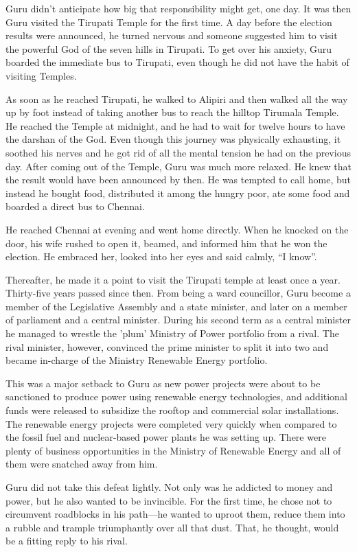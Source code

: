 Guru didn't anticipate how big that responsibility might get, one day. It was
then Guru visited the Tirupati Temple for the first time. A day before the
election results were announced, he turned nervous and someone suggested him to
visit the powerful God of the seven hills in Tirupati. To get over his anxiety,
Guru boarded the immediate bus to Tirupati, even though he did not have the
habit of visiting Temples.

As soon as he reached Tirupati, he walked to Alipiri and then walked all the way
up by foot instead of taking another bus to reach the hilltop Tirumala Temple.
He reached the Temple at midnight, and he had to wait for twelve hours to have
the darshan of the God. Even though this journey was physically exhausting, it
soothed his nerves and he got rid of all the mental tension he had on the
previous day. After coming out of the Temple, Guru was much more relaxed. He
knew that the result would have been announced by then. He was tempted to call
home, but instead he bought food, distributed it among the hungry poor, ate some
food and boarded a direct bus to Chennai.

He reached Chennai at evening and went home directly. When he knocked on the
door, his
wife rushed to open it, beamed, and informed him that he won the election. He
embraced her, looked into her eyes and said calmly, “I know”.

Thereafter, he made it a point to visit the Tirupati temple at least once a
year. Thirty-five years passed since then. From being a ward councillor, Guru
become a member of the Legislative Assembly and a state minister, and later on
a member of parliament and a central minister. During his second term as a central
minister he managed to wrestle the 'plum' Ministry of Power portfolio from a rival.
The rival minister, however, convinced the prime minister to split it
into two and became in-charge of the Ministry Renewable Energy portfolio.

This was a major setback to Guru as new power projects were about to be
sanctioned to produce power using renewable energy technologies, and additional
funds were released to subsidize the rooftop and commercial solar installations.
The renewable energy projects were completed very quickly when compared to the
fossil fuel and nuclear-based power plants he was setting up. There were plenty of
business opportunities in the Ministry of Renewable Energy and all of them were
snatched away from him.

Guru did not take this defeat lightly. Not only was he addicted to money and
power, but he also wanted to be invincible. For the first time, he chose not to
circumvent roadblocks in his path—he wanted to uproot them, reduce them into a
rubble and trample triumphantly over all that dust. That, he thought, would be a
fitting reply to his rival.
